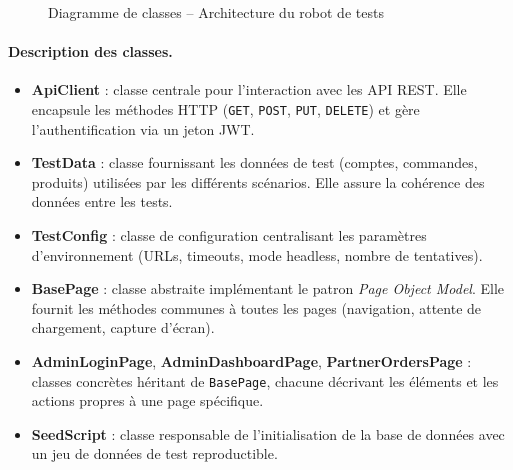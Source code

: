\begin{figure}[H]
\caption{Diagramme de classes -- Architecture du robot de tests}
\label{fig:class-diagram}
\end{figure}

\paragraph{Description des classes.}
\begin{itemize}[nosep]
    \item \textbf{ApiClient} : classe centrale pour l'interaction avec les API REST. Elle encapsule les méthodes HTTP (\texttt{GET}, \texttt{POST}, \texttt{PUT}, \texttt{DELETE}) et gère l'authentification via un jeton JWT.
    \item \textbf{TestData} : classe fournissant les données de test (comptes, commandes, produits) utilisées par les différents scénarios. Elle assure la cohérence des données entre les tests.
    \item \textbf{TestConfig} : classe de configuration centralisant les paramètres d'environnement (URLs, timeouts, mode headless, nombre de tentatives).
    \item \textbf{BasePage} : classe abstraite implémentant le patron \textit{Page Object Model}. Elle fournit les méthodes communes à toutes les pages (navigation, attente de chargement, capture d'écran).
    \item \textbf{AdminLoginPage}, \textbf{AdminDashboardPage}, \textbf{PartnerOrdersPage} : classes concrètes héritant de \texttt{BasePage}, chacune décrivant les éléments et les actions propres à une page spécifique.
    \item \textbf{SeedScript} : classe responsable de l'initialisation de la base de données avec un jeu de données de test reproductible.
\end{itemize}

